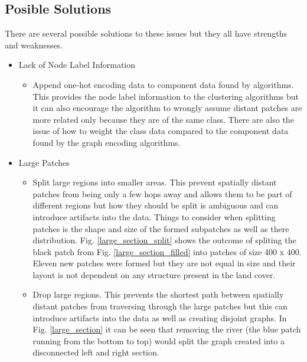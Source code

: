 \documentclass[conference]{IEEEtran}
\begin{document}
	
	
	\subsection{Posible Solutions}
	There are several possible solutions to these issues but they all have strengths and weaknesses. 
	
	\begin{itemize}
		\item Lack of Node Label Information
		\begin{itemize}
			\item Append one-hot encoding data to component data found by algorithms. This provides the node label information to the clustering algorithms but it can also encourage the algorithm to wrongly assume distant patches are more related only because they are of the same class. There are also the issue of how to weight the class data compared to the component data found by the graph encoding algorithms.
		\end{itemize}		
		
		\item Large Patches
		\begin{itemize}
			\item Split large regions into smaller areas. This prevent spatially distant patches from being only a few hops away and allows them to be part of different regions but how they should be split is ambiguous and can introduce artifacts into the data. Things to consider when splitting patches is the shape and size of the formed subpatches as well as there distribution. Fig. \ref{large_section_split} shows the outcome of spliting the black patch from Fig. \ref{large_section_filled} into patches of size 400 x 400. Eleven new patches were formed but they are not equal in size and their layout is not dependent on any structure present in the land cover. 
			\item Drop large regions. This prevents the shortest path between spatially distant patches from traversing through the large patches but this can introduce artifacts into the data as well as creating disjoint graphs. In Fig. \ref{large_section} it can be seen that removing the river (the blue patch running from the bottom to top) would split the graph created into a disconnected left and right section. 
		\end{itemize}
	

\end{itemize}
\end{document}
